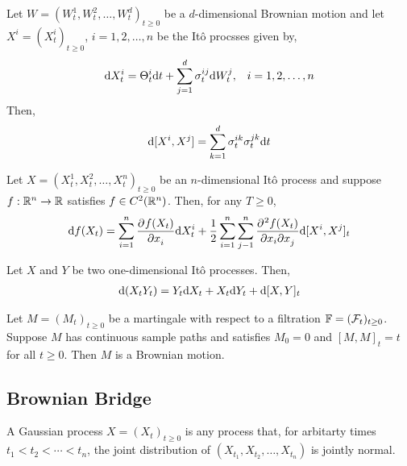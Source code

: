 \documentclass[12pt]{article}
\begin{document}
\begin{theorem}
Let \( W = (W_t^1, W_t^2, \ldots, W_t^d)_{t\geq 0} \) be a \( d \)-dimensional Brownian motion and let \( X^i = (X_t^i)_{t\geq 0} \), \( i=1,2,\ldots, n \) be the It\^o procsses given by,
\begin{align*}
    \mathrm{d} X_t^i = \Theta_t^i \mathrm{d} t + \sum_{j=1}^{d} \sigma_t^{ij} \mathrm{d} W_t^j, && i=1,2,\ldots, n
\end{align*}
Then,
\begin{align*}
    \mathrm{d}[X^i,X^j] = \sum_{k=1}^{d} \sigma_t^{ik} \sigma_t^{jk} \mathrm{d} t
\end{align*}
\end{theorem}

\begin{theorem}
Let \( X = (X_t^1, X_t^2, \ldots, X_t^n)_{t\geq 0} \) be an \( n \)-dimensional It\^o process and suppose \( f:\mathbb{R}^n\to \mathbb{R} \) satisfies \( f\in C^2(\mathbb{R}^n) \). Then, for any \( T\geq 0 \),
\begin{align*}
    \mathrm{d} f(X_t) = \sum_{i=1}^{n} \frac{\partial^{}f(X_t)}{\partial x_i^{}} \mathrm{d} X_t^i  + \frac{1}{2} \sum_{i=1}^{n} \sum_{j-1}^{n} \frac{\partial^{}{^2}f(X_t)}{\partial x_i \partial x_j^{}} \mathrm{d}[X^i,X^j]_t
\end{align*}
\end{theorem}

\begin{lemma}
Let \( X \) and \( Y \) be two one-dimensional It\^o processes. Then,
\begin{align*}
    \mathrm{d}(X_tY_t) = Y_t\mathrm{d} X_t + X_t \mathrm{d} Y_t + \mathrm{d} [X,Y]_t
\end{align*}
\end{lemma}

\begin{theorem}
Let \( M = (M_t)_{t\geq0} \) be a martingale with respect to a filtration \( \mathbb{F} = (\mathcal{F}_t)_{t\geq0} \). Suppose \( M \) has continuous sample paths and satisfies \( M_0 = 0 \) and \( [M,M]_t = t \) for all \( t\geq 0 \). Then \( M \) is a Brownian motion.
\end{theorem}

\subsection{Brownian Bridge}
\begin{definition}
A Gaussian process \( X = (X_t)_{t\geq 0} \) is any process that, for arbitarty times \( t_1<t_2<\cdots<t_n \), the joint distribution of \( (X_{t_1},X_{t_2},\ldots, X_{t_n}) \) is jointly normal.
\end{definition}
\end{document}
